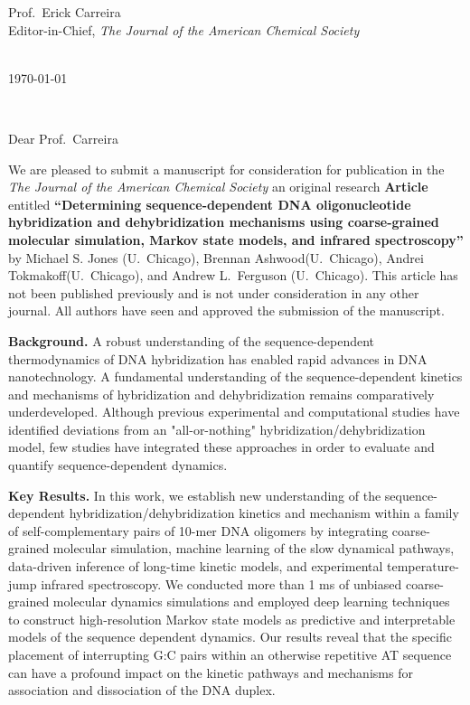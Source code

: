 \documentclass[11pt,a4paper]{letter} %
\makeatletter
\def\opening#1{\thispagestyle{empty}
{\centering\fromaddress \vspace{1.1in} \\ %
%
\hspace*{4.15 in}\today\hspace*{\fill}\par
} %
{\raggedright \toname \\ \toaddress \par} %
\vspace{0.05in} %
\noindent #1 %
}
\makeatother
\begin{document}

\begin{letter}
{
Prof.\ Erick Carreira \\
Editor-in-Chief, \textit{The Journal of the American Chemical Society}
}

\newcommand*{\noteb}[1]{\textcolor{blue}{[[#1]]}}		%

\opening{Dear Prof.\ Carreira}

We are pleased to submit a manuscript for consideration for publication in the \textit{The Journal of the American Chemical Society} an original research \textbf{Article} entitled \textbf{``Determining sequence-dependent DNA oligonucleotide hybridization and dehybridization mechanisms using coarse-grained molecular simulation, Markov state models, and infrared spectroscopy''} by Michael S. Jones (U.~Chicago), Brennan Ashwood(U.~Chicago), Andrei Tokmakoff(U.~Chicago), and Andrew L.\ Ferguson (U.~Chicago). This article has not been published previously and is not under consideration in any other journal. All authors have seen and approved the submission of the manuscript.

\textbf{Background.}  A robust understanding of the sequence-dependent thermodynamics of DNA hybridization has enabled rapid advances in DNA nanotechnology. A fundamental understanding of the sequence-dependent kinetics and mechanisms of hybridization and dehybridization remains comparatively underdeveloped. Although previous experimental and computational studies have identified deviations from an "all-or-nothing" hybridization/dehybridization model, few studies have integrated these approaches in order to evaluate and quantify sequence-dependent dynamics.

\textbf{Key Results.}  In this work, we establish new understanding of the sequence-dependent hybridization/dehybridization kinetics and mechanism within a family of self-complementary pairs of 10-mer DNA oligomers by integrating coarse-grained molecular simulation, machine learning of the slow dynamical pathways, data-driven inference of long-time kinetic models, and experimental temperature-jump infrared spectroscopy. We conducted more than 1 ms of unbiased coarse-grained molecular dynamics simulations and employed deep learning techniques to construct high-resolution Markov state models as predictive and interpretable models of the sequence dependent dynamics. Our results reveal that the specific placement of interrupting G:C pairs within an otherwise repetitive AT sequence can have a profound impact on the kinetic pathways and mechanisms for association and dissociation of the DNA duplex.


\end{letter}
\end{document}
